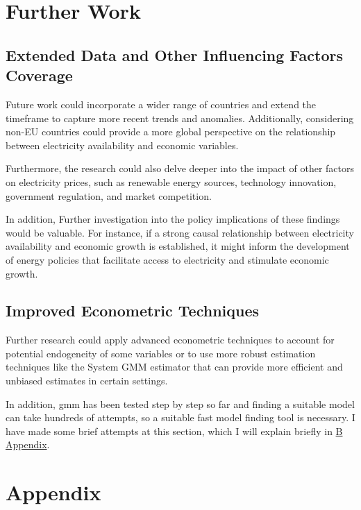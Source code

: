 \documentclass[12pt]{article}
\begin{document}
\section{Further Work }
\subsection{Extended Data and Other Influencing Factors Coverage}
Future work could incorporate a wider range of countries and extend the timeframe to capture more recent trends and anomalies. Additionally, considering non-EU countries could provide a more global perspective on the relationship between electricity availability and economic variables.

Furthermore, the research could also delve deeper into the impact of other factors on electricity prices, such as renewable energy sources, technology innovation, government regulation, and market competition.

In addition, Further investigation into the policy implications of these findings would be valuable. For instance, if a strong causal relationship between electricity availability and economic growth is established, it might inform the development of energy policies that facilitate access to electricity and stimulate economic growth.

\subsection{Improved Econometric Techniques}
Further research could apply advanced econometric techniques to account for potential endogeneity of some variables or to use more robust estimation techniques like the System GMM estimator that can provide more efficient and unbiased estimates in certain settings.

In addition, gmm has been tested step by step so far and finding a suitable model can take hundreds of attempts, so a suitable fast model finding tool is necessary. I have made some brief attempts at this section, which I will explain briefly in \hyperlink{thesentence}{B Appendix}.



\newpage



\printbibliography

\newpage
{}
\appendix

\section{Appendix}
\hypertarget{A}{}
\end{document}
